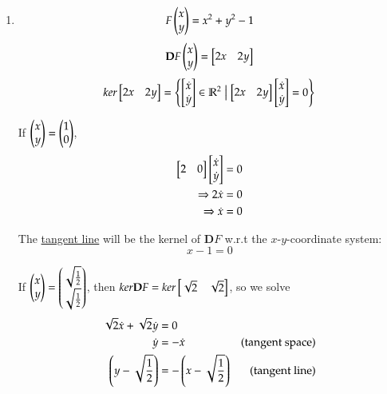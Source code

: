 \begin{enumerate}[1.]
\item
\begin{minipage}{0.7\textwidth}
\[F\begin{pmatrix} x \\ y \end{pmatrix}=x^2+y^2-1\]
\[\textbf{D}F\begin{pmatrix} x \\ y \end{pmatrix}=\begin{bmatrix} 2x & 2y \end{bmatrix}\]
\[ker\begin{bmatrix} 2x & 2y \end{bmatrix} = \left\{ \begin{bmatrix} \dot{x} \\ \dot{y} \end{bmatrix}\in \mathbb{R}^2 \bigm| \begin{bmatrix} 2x & 2y \end{bmatrix}\begin{bmatrix} \dot{x} \\ \dot{y} \end{bmatrix}=0 \right\}\]
\end{minipage}
\begin{minipage}{0.15\textwidth}
If $\begin{pmatrix} x \\ y \end{pmatrix} = \begin{pmatrix} 1 \\ 0 \end{pmatrix}$,
\begin{align*}
  \begin{bmatrix} 2 & 0 \end{bmatrix}\begin{bmatrix} \dot{x} \\ \dot{y} \end{bmatrix} &= 0 \\
  \Rightarrow 2\dot{x} &= 0 \\
  \Rightarrow \dot{x} &= 0
\end{align*}
\end{minipage}

\begin{center}
\end{center}

The \ul{tangent line} will be the kernel of $\bm{D}F$ w.r.t the $x$-$y$-coordinate system:
\[\boxed{x-1=0}\]

If $\begin{pmatrix} x \\ y \end{pmatrix} = \begin{pmatrix} \sqrt{\frac{1}{2}} \\ \sqrt{\frac{1}{2}} \end{pmatrix}$, then $ker \textbf{D}F = ker\begin{bmatrix} \sqrt{2} & \sqrt{2} \end{bmatrix}$, so we solve
\begin{align*}
\sqrt{2}\dot{x}+\sqrt{2}\dot{y}&=0 \\
\dot{y}&=-\dot{x} & \text{(tangent space)} \\
\left( y-\sqrt{\frac{1}{2}} \right) &=-\left( x-\sqrt{\frac{1}{2}} \right) & \text{(tangent line)}
\end{align*}


\end{enumerate}
